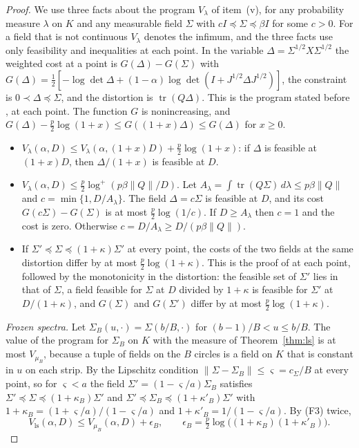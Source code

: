 \documentclass[11pt,onecolumn]{IEEEtran}
\newcommand{\tr}{\operatorname{tr}}
\newcommand{\Vls}{V_{\mathrm{ls}}}
\begin{document}
\begin{proof}
We use three facts about the program $V_\lambda$ of item~(v), for any
probability measure $\lambda$ on $K$ and any measurable field $\Sigma$
with $cI\preceq\Sigma\preceq\beta I$ for some $c>0$. For a field that is
not continuous $V_\lambda$ denotes the infimum, and the three facts use
only feasibility and inequalities at each point. In the variable
$\Delta=\Sigma^{1/2}X\Sigma^{1/2}$ the weighted cost at a point is
$G(\Delta)-G(\Sigma)$ with
$G(\Delta)=\tfrac12[-\log\det\Delta+(1-\alpha)\log\det(I+J^{1/2}\Delta J^{1/2})]$,
the constraint is $0\prec\Delta\preceq\Sigma$, and the distortion is
$\tr(Q\Delta)$. This is the program stated before
\cite[Lemma~11]{part2}, at each point.
The function $G$ is nonincreasing, and
$G(\Delta)-\tfrac p2\log(1+x)\le G((1+x)\Delta)\le G(\Delta)$ for
$x\ge0$.
\begin{itemize}
\item[(F1)] $V_\lambda(\alpha,D)\le V_\lambda(\alpha,(1+x)D)+\tfrac p2\log(1+x)$:
if $\Delta$ is feasible at $(1+x)D$, then $\Delta/(1+x)$ is feasible at
$D$.
\item[(F2)] $V_\lambda(\alpha,D)\le\tfrac p2\log^+(p\beta\|Q\|/D)$. Let
$A_\lambda=\int\tr(Q\Sigma)\,d\lambda\le p\beta\|Q\|$ and
$c=\min\{1,D/A_\lambda\}$. The field $\Delta=c\Sigma$ is feasible at $D$,
and its cost $G(c\Sigma)-G(\Sigma)$ is at most $\tfrac p2\log(1/c)$. If
$D\ge A_\lambda$ then $c=1$ and the cost is zero. Otherwise
$c=D/A_\lambda\ge D/(p\beta\|Q\|)$.
\item[(F3)] If $\Sigma'\preceq\Sigma\preceq(1+\kappa)\Sigma'$ at every
point, the costs of the two fields at the same distortion differ by
at most $\tfrac p2\log(1+\kappa)$. This is the proof of
\cite[Lemma~11(b)]{part2} at each point, followed by the monotonicity
in the distortion: the feasible set of $\Sigma'$ lies in that of
$\Sigma$, a field feasible for $\Sigma$ at $D$ divided by $1+\kappa$ is
feasible for $\Sigma'$ at $D/(1+\kappa)$, and $G(\Sigma)$ and
$G(\Sigma')$ differ by at most $\tfrac p2\log(1+\kappa)$.
\end{itemize}

\emph{Frozen spectra.} Let $\Sigma_B(u,\cdot)=\Sigma(b/B,\cdot)$ for
$(b-1)/B<u\le b/B$. The value of the program for $\Sigma_B$ on $K$
with the measure of Theorem~\ref{thm:ls} is at most $V_{\mu_B}$,
because a tuple of fields on the $B$ circles is a field on $K$ that is
constant in $u$ on each strip. By the Lipschitz
condition $\|\Sigma-\Sigma_B\|\le\varsigma=c_\Sigma/B$ at every point, so
for $\varsigma<a$ the field $\Sigma'=(1-\varsigma/a)\Sigma_B$ satisfies
$\Sigma'\preceq\Sigma\preceq(1+\kappa_B)\Sigma'$ and
$\Sigma'\preceq\Sigma_B\preceq(1+\kappa'_B)\Sigma'$ with
$1+\kappa_B=(1+\varsigma/a)/(1-\varsigma/a)$ and
$1+\kappa'_B=1/(1-\varsigma/a)$. By (F3) twice,
\[
\Vls(\alpha,D)\le V_{\mu_B}(\alpha,D)+\epsilon_B,\qquad
\epsilon_B=\tfrac p2\log\bigl((1+\kappa_B)(1+\kappa'_B)\bigr).
\]


\end{proof}
\end{document}
